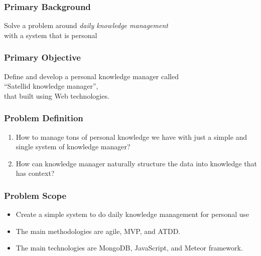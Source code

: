 \documentclass[10pt, compress]{beamer}
\begin{document}

\begin{frame}[fragile]
  \frametitle{Primary Background}

  Solve a problem around \alert{\emph{daily knowledge management}} \\
  with a system that is personal

\end{frame}


\begin{frame}[fragile]
  \frametitle{Primary Objective}

  Define and develop a personal knowledge manager called\\
  \alert{``Satellid knowledge manager''},\\
  that built using Web technologies.

\end{frame}


\begin{frame}[fragile]
  \frametitle{Problem Definition}

  \begin{enumerate}
    \item How to manage tons of personal knowledge we have with just a simple and single system of knowledge manager?
    \item How can knowledge manager naturally structure the data into knowledge that has context?
  \end{enumerate}

\end{frame}


\begin{frame}[fragile]
  \frametitle{Problem Scope}

  \begin{itemize} \itemsep0pt
    \item Create a \alert{simple system} to do \alert{daily knowledge management} for \alert{personal} use
    \item The main methodologies are \alert{agile}, \alert{MVP}, and \alert{ATDD}.
    \item The main technologies are \alert{MongoDB}, \alert{JavaScript}, and \alert{Meteor framework}.
  \end{itemize}

\end{frame}
\end{document}
